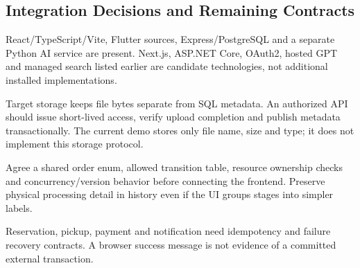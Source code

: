 \subsection{Integration Decisions and Remaining Contracts}
\begin{description}[style=nextline]
\item[Current stack] React/TypeScript/Vite, Flutter sources, Express/PostgreSQL
and a separate Python AI service are present. Next.js, ASP.NET Core, OAuth2,
hosted GPT and managed search listed earlier are candidate technologies, not
additional installed implementations.
\item[Private scan design] Target storage keeps file bytes separate from SQL
metadata. An authorized API should issue short-lived access, verify upload
completion and publish metadata transactionally. The current demo stores only
file name, size and type; it does not implement this storage protocol.
\item[Status integration] Agree a shared order enum, allowed transition table,
resource ownership checks and concurrency/version behavior before connecting
the frontend. Preserve physical processing detail in history even if the UI
groups stages into simpler labels.
\item[Transaction boundaries] Reservation, pickup, payment and notification need
idempotency and failure recovery contracts. A browser success message is not
evidence of a committed external transaction.
\end{description}
